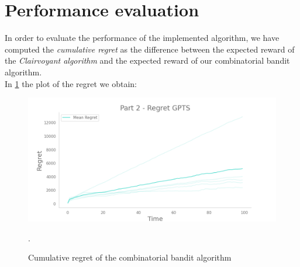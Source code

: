 \section{Performance evaluation}
In order to evaluate the performance of the implemented algorithm, we have computed the \emph{cumulative regret} as the difference between the expected reward of the \textit{Clairvoyant algorithm} and the expected reward of our combinatorial bandit algorithm.\\
In \ref{regret2Fig} the plot of the regret we obtain:
\begin{figure}[!htb]
	\centering
		\includegraphics[width=\textwidth]{images/part2.png}
	\caption{Cumulative regret of the combinatorial bandit algorithm}.
	\label{regret2Fig}
\end{figure}


